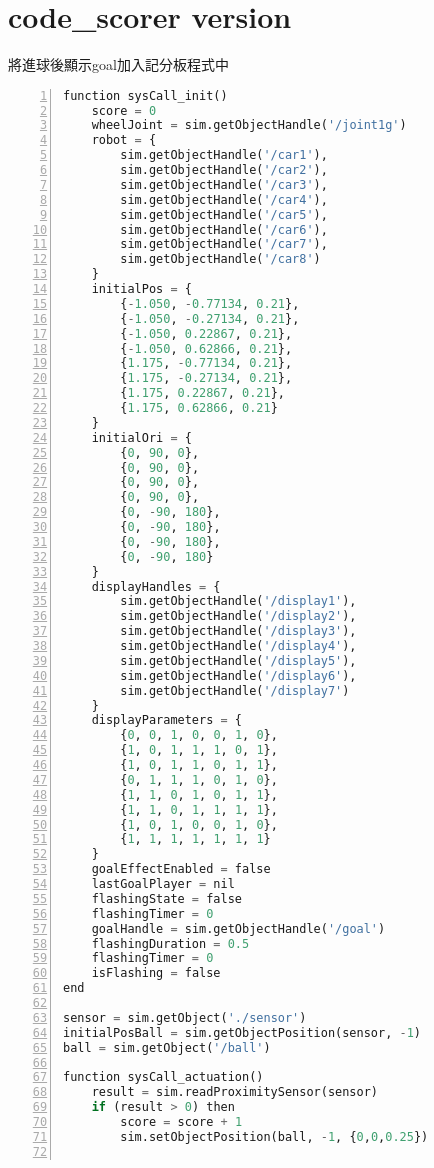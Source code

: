 \section{code\_scorer version}
將進球後顯示goal加入記分板程式中\\
\begin{lstlisting}[language=Python, frame=single, numbers=left, captionpos=b, basicstyle=\ttfamily\small, showstringspaces=false, breaklines=true, tabsize=4, xleftmargin=15pt]
function sysCall_init()
    score = 0
    wheelJoint = sim.getObjectHandle('/joint1g')
    robot = {
        sim.getObjectHandle('/car1'),
        sim.getObjectHandle('/car2'),
        sim.getObjectHandle('/car3'),
        sim.getObjectHandle('/car4'),
        sim.getObjectHandle('/car5'),
        sim.getObjectHandle('/car6'),
        sim.getObjectHandle('/car7'),
        sim.getObjectHandle('/car8')
    }
    initialPos = {
        {-1.050, -0.77134, 0.21},
        {-1.050, -0.27134, 0.21},
        {-1.050, 0.22867, 0.21},
        {-1.050, 0.62866, 0.21},
        {1.175, -0.77134, 0.21},
        {1.175, -0.27134, 0.21},
        {1.175, 0.22867, 0.21},
        {1.175, 0.62866, 0.21}
    }
    initialOri = {
        {0, 90, 0},
        {0, 90, 0},
        {0, 90, 0},
        {0, 90, 0},
        {0, -90, 180},
        {0, -90, 180},
        {0, -90, 180},
        {0, -90, 180}
    }
    displayHandles = {
        sim.getObjectHandle('/display1'),
        sim.getObjectHandle('/display2'),
        sim.getObjectHandle('/display3'),
        sim.getObjectHandle('/display4'),
        sim.getObjectHandle('/display5'),
        sim.getObjectHandle('/display6'),
        sim.getObjectHandle('/display7')
    }
    displayParameters = {
        {0, 0, 1, 0, 0, 1, 0},
        {1, 0, 1, 1, 1, 0, 1},
        {1, 0, 1, 1, 0, 1, 1},
        {0, 1, 1, 1, 0, 1, 0},
        {1, 1, 0, 1, 0, 1, 1},
        {1, 1, 0, 1, 1, 1, 1},
        {1, 0, 1, 0, 0, 1, 0},
        {1, 1, 1, 1, 1, 1, 1}
    }
    goalEffectEnabled = false
    lastGoalPlayer = nil
    flashingState = false
    flashingTimer = 0
    goalHandle = sim.getObjectHandle('/goal')
    flashingDuration = 0.5
    flashingTimer = 0
    isFlashing = false
end
 
sensor = sim.getObject('./sensor')
initialPosBall = sim.getObjectPosition(sensor, -1)
ball = sim.getObject('/ball')
 
function sysCall_actuation()
    result = sim.readProximitySensor(sensor)
    if (result > 0) then
        score = score + 1
        sim.setObjectPosition(ball, -1, {0,0,0.25})
         

\end{lstlisting}
